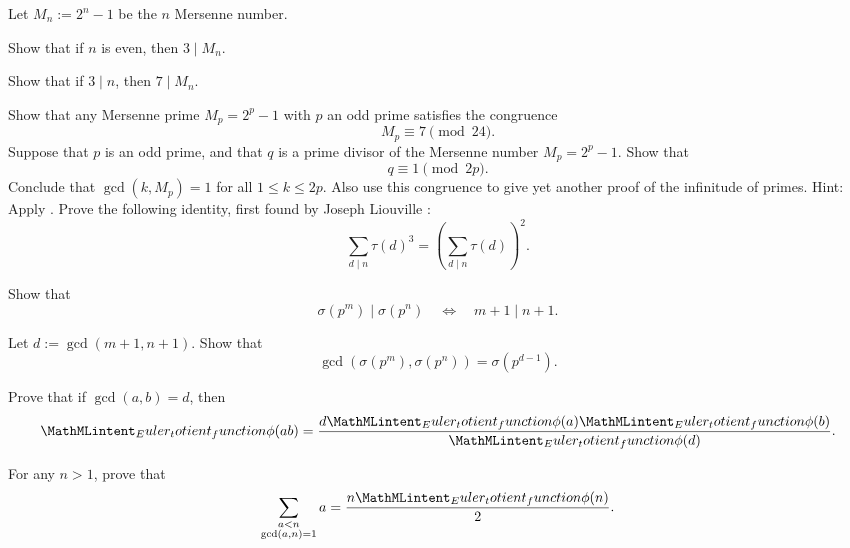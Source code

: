 \begin{routine}
  \exercise Let $M_n:=2^n-1$ be the $n$\supth{} Mersenne number.
  \begin{subexenum}
  \item Show that if $n$ is even, then $3\mid M_n$.
  \item Show that if $3\mid n$, then $7\mid M_n$.
  \end{subexenum}
  \exercise Show that any Mersenne prime $M_p=2^p-1$ with $p$ an odd prime satisfies the congruence
  \begin{equation*}
    M_p\equiv 7\pmod{24}.
  \end{equation*}
  \exercise Suppose that $p$ is an odd prime, and that $q$ is a prime divisor of the Mersenne number $M_p=2^p-1$. Show that
  \begin{equation*}
    q\equiv 1\pmod{2p}.
  \end{equation*}
  Conclude that $\gcd(k,M_p)=1$ for all $1\leq k \leq 2p$. Also use this congruence to give yet another proof of the infinitude of primes.
  Hint: Apply .
  \exercise Prove the following identity, first found by Joseph Liouville \cite{liouville1857}:
  \begin{equation*}
    \sum_{d\mid n}\tau(d)^3 = \left(\sum_{d\mid n}\tau(d)\right)^2.
  \end{equation*}
  \exercise
  \begin{subexenum}
  \item Show that
    \begin{equation*}
      \sigma(p^m)\mid \sigma(p^n)\quad\Leftrightarrow\quad m+1\mid n+1.
    \end{equation*}
  \item Let $d:=\gcd(m+1,n+1)$. Show that
    \begin{equation*}
      \gcd(\sigma(p^m),\sigma(p^n))=\sigma(p^{d-1}).
    \end{equation*}
  \end{subexenum}
  \exercise
  \begin{subexenum}
  \item Prove that if $\gcd(a,b)=d$, then
  \begin{equation*}
    \totient(ab)=\frac{d\totient(a)\totient(b)}{\totient(d)}.
  \end{equation*}
  \item For any $n>1$, prove that
  \begin{equation*}
    \sum_{\substack{a<n\\\gcd(a,n)=1}}a = \frac{n\totient(n)}{2}.

\end{equation*}
\end{subexenum}
\end{routine}
